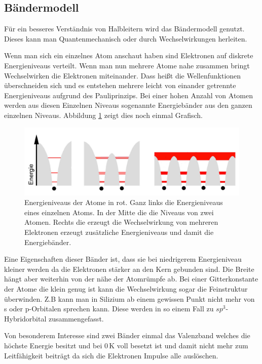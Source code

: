\subsection{Bändermodell}
Für ein besseres Verständnis von Halbleitern wird das Bändermodell genutzt. Dieses kann man Quantenmechanisch oder durch Wechselwirkungen herleiten.\par 
Wenn man sich ein einzelnes Atom anschaut haben sind Elektronen auf diskrete  Energieniveaus verteilt. Wenn man nun mehrere Atome nahe zusammen bringt Wechselwirken die Elektronen miteinander. Dass heißt die Wellenfunktionen überschneiden sich und es entstehen mehrere leicht von einander getrennte Energieniveaus aufgrund des Pauliprinzips. Bei einer hohen Anzahl von Atomen werden aus diesen Einzelnen Niveaus sogenannte Energiebänder aus den ganzen einzelnen Niveaus.
Abbildung \ref{WW} zeigt dies noch einmal Grafisch.\par
\begin{figure}[ht]
	\includegraphics[scale=0.4]{Bild/Bendermodel}
	\centering
	\caption[Bändermodel]{Energieniveaus der Atome in rot. Ganz links die Energieniveaus eines einzelnen Atoms. In der Mitte die die Niveaus von zwei Atomen. Rechts die erzeugt die Wechselwirkung von mehreren Elektronen erzeugt zusätzliche Energieniveaus und damit die Energiebänder.}
	\label{WW}
\end{figure}
Eine Eigenschaften dieser Bänder ist, dass sie bei niedrigerem Energieniveau kleiner werden da die Elektronen stärker an den Kern gebunden sind. Die Breite hängt aber weiterhin von der nähe der Atomrümpfe ab. Bei einer Gitterkonstante der Atome die klein genug ist kann die Wechselwirkung sogar die Feinstruktur überwinden. Z.B kann man in Silizium ab einem gewissen Punkt nicht mehr von s oder p-Orbitalen sprechen kann. Diese werden in so einem Fall zu $sp^3$-Hybridorbital zusammengefasst.\par
Von besonderem Interesse sind zwei Bänder einmal das Valenzband welches die höchste Energie besitzt und bei $0$\,K voll besetzt ist und damit nicht mehr zum Leitfähigkeit beiträgt da sich die Elektronen Impulse alle auslöschen.\par
